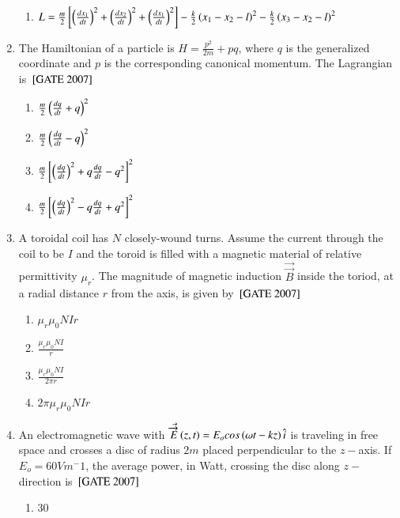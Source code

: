 \documentclass[journal]{IEEEtran}
\begin{document}
\begin{enumerate}
\begin{enumerate}
       \item $L = \frac{m}{2}{}\left[\left(\frac{dx_1}{dt}\right)^2 +\left(\frac{dx_2}{dt}\right)^2 +\left(\frac{dx_1}{dt}\right)^2\right]-\frac{k}{2}\left(x_1-x_2-l\right)^2 - \frac{k}{2}\left(x_3 - x_2 - l\right)^2$
\end{enumerate}
\item The Hamiltonian of a particle is $H = \frac{p^2}{2m} + pq$, where $q$ is the generalized coordinate and $p$ is the corresponding canonical momentum. The Lagrangian is \hfill{${}\left[\text{GATE 2007}\right]$} 
\begin{multicols}{2}
\begin{enumerate}
    \item $\frac{m}{2}\left(\frac{dq}{dt} + q\right)^2$
    \item $\frac{m}{2}\left(\frac{dq}{dt} - q\right)^2$
    \item $\frac{m}{2}{}\left[\left(\frac{dq}{dt}\right)^2 + q\frac{dq}{dt}-q^2\right]^2$
    \item $\frac{m}{2}{}\left[\left(\frac{dq}{dt}\right)^2 - q\frac{dq}{dt}+q^2\right]^2$
\end{enumerate}
\end{multicols}
\item A toroidal coil has $N$ closely-wound turns. Assume the current through the coil to be $I$ and the toroid is filled with a magnetic material of relative permittivity $\mu_r$. The magnitude of magnetic induction $\Vec{\overrightarrow{B}}$ inside the toriod, at a radial distance $r$ from the axis, is given by 
\hfill{${}\left[\text{GATE 2007}\right]$} 
\begin{multicols}{4}
\begin{enumerate}
    \item $\mu_r\mu_0NIr$
    \item $\frac{\mu_r\mu_0NI}{r}$
    \item $\frac{\mu_r\mu_0NI}{2\pi r}$
    \item $2\pi\mu_r\mu_0NIr$
\end{enumerate}
\end{multicols}
\item An electromagnetic wave with $\Vec{\overrightarrow{E
}}\left(z,t\right) = E_ocos\left(\omega t-kz\right)\hat{i}$ is traveling in free space and crosses a disc of radius $2 m$ placed perpendicular to the $z-$axis. If $E_o = 60 V m^-1$, the average power, in Watt, crossing the disc along $z-$direction is 
\hfill{${}\left[\text{GATE 2007}\right]$} \begin{multicols}{4}  
\begin{enumerate}
    \item $30$

\end{enumerate}
\end{multicols}
\end{enumerate}
\end{document}
